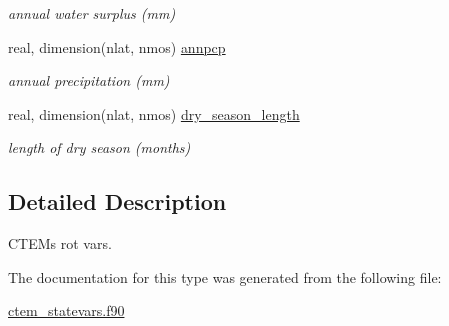 \begin{DoxyCompactItemize}
\begin{DoxyCompactList}\small\item\em annual water surplus (mm) \end{DoxyCompactList}\item 
\hypertarget{structctem__statevars_1_1veg__rot_a33d8786af675b3730ad9137c6ce77d74}{}real, dimension(nlat, nmos) \hyperlink{structctem__statevars_1_1veg__rot_a33d8786af675b3730ad9137c6ce77d74}{annpcp}\label{structctem__statevars_1_1veg__rot_a33d8786af675b3730ad9137c6ce77d74}

\begin{DoxyCompactList}\small\item\em annual precipitation (mm) \end{DoxyCompactList}\item 
\hypertarget{structctem__statevars_1_1veg__rot_a24757068deba766b0e5ffb542a467bd8}{}real, dimension(nlat, nmos) \hyperlink{structctem__statevars_1_1veg__rot_a24757068deba766b0e5ffb542a467bd8}{dry\+\_\+season\+\_\+length}\label{structctem__statevars_1_1veg__rot_a24757068deba766b0e5ffb542a467bd8}

\begin{DoxyCompactList}\small\item\em length of dry season (months) \end{DoxyCompactList}\end{DoxyCompactItemize}


\subsection{Detailed Description}
C\+T\+E\+M\textquotesingle{}s \textquotesingle{}rot\textquotesingle{} vars. 

The documentation for this type was generated from the following file\+:\begin{DoxyCompactItemize}
\item 
\hyperlink{ctem__statevars_8f90}{ctem\+\_\+statevars.\+f90}\end{DoxyCompactItemize}
